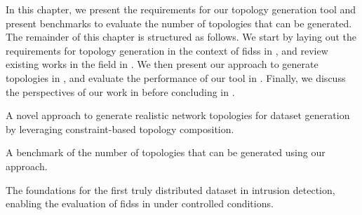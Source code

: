 In this chapter, we present the requirements for our topology generation tool and present benchmarks to evaluate the number of topologies that can be generated.
The remainder of this chapter is structured as follows.
We start by laying out the requirements for topology generation in the context of \glspl{fids} in , and review existing works in the field in .
We then present our approach to generate topologies in , and evaluate the performance of our tool in .
Finally, we discuss the perspectives of our work in  before concluding in .

\begin{contribs}
  \item A novel approach to generate realistic network topologies for dataset generation by leveraging constraint-based topology composition.
  \item A benchmark of the number of topologies that can be generated using our approach.
  \item The foundations for the first truly distributed dataset in intrusion detection, enabling the evaluation of \glspl{fids} in under controlled conditions.
\end{contribs}